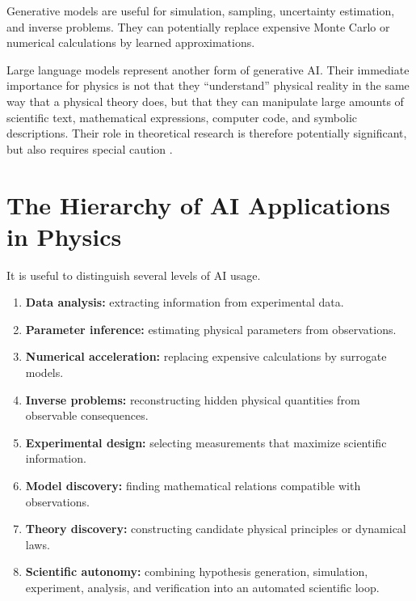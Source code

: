 \documentclass[11pt,a4paper]{article}
\begin{document}
Generative models are useful for simulation, sampling, uncertainty estimation,
and inverse problems. They can potentially replace expensive Monte Carlo or
numerical calculations by learned approximations.

Large language models represent another form of generative AI. Their immediate
importance for physics is not that they ``understand'' physical reality in the
same way that a physical theory does, but that they can manipulate large
amounts of scientific text, mathematical expressions, computer code, and
symbolic descriptions. Their role in theoretical research is therefore
potentially significant, but also requires special caution
\cite{He2024}.

\section{The Hierarchy of AI Applications in Physics}

It is useful to distinguish several levels of AI usage.

\begin{enumerate}[label=\arabic*.]
\item \textbf{Data analysis:} extracting information from experimental data.

\item \textbf{Parameter inference:} estimating physical parameters from
observations.

\item \textbf{Numerical acceleration:} replacing expensive calculations by
surrogate models.

\item \textbf{Inverse problems:} reconstructing hidden physical quantities from
observable consequences.

\item \textbf{Experimental design:} selecting measurements that maximize
scientific information.

\item \textbf{Model discovery:} finding mathematical relations compatible with
observations.

\item \textbf{Theory discovery:} constructing candidate physical principles or
dynamical laws.

\item \textbf{Scientific autonomy:} combining hypothesis generation, simulation,
experiment, analysis, and verification into an automated scientific loop.
\end{enumerate}
\end{document}
